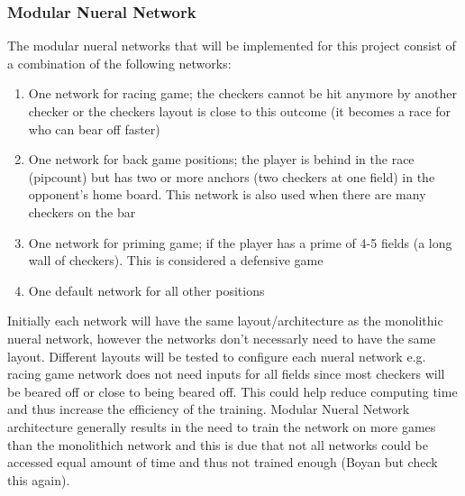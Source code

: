 \documentclass[12pt,a4paper]{article}
\begin{document}
\subsubsection{Modular Nueral Network}
The modular nueral networks that will be implemented for this project consist of a combination of the following networks:
\begin{enumerate}
    \item One network for racing game; the checkers cannot be hit anymore by another checker or the checkers layout is close to this outcome (it becomes a race for who can bear off faster)
    \item One network for back game positions; the player is behind in the race (pipcount) but has two or more anchors (two checkers at one field) in the opponent's home board. This network is also used when there are many checkers on the bar
    \item One network for priming game; if the player has a prime of 4-5 fields (a long wall of checkers). This is considered a defensive game
    \item One default network for all other positions
\end{enumerate}
Initially each network will have the same layout/architecture as the monolithic nueral network, however the networks don't necessarly need to have the same layout. Different layouts will be tested to configure each nueral network e.g. racing game network does not need inputs for all fields since most checkers will be beared off or close to being beared off. This could help reduce computing time and thus increase the efficiency of the training. Modular Nueral Network architecture generally results in the need to train the network on more games than the monolithich network and this is due that not all networks could be accessed equal amount of time and thus not trained enough (Boyan but check this again).
\end{document}
